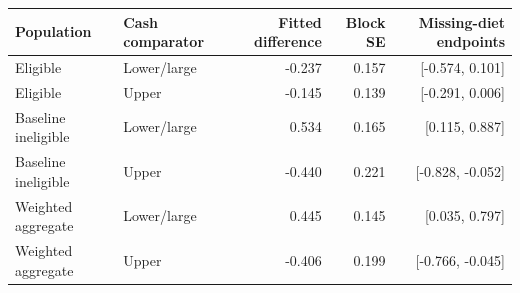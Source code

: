 \begin{tabular}{llrrr}
\toprule
Population & Cash comparator & Fitted difference & Block SE & Missing-diet endpoints\\
\midrule
Eligible & Lower/large & -0.237 & 0.157 & [-0.574, 0.101]\\
Eligible & Upper & -0.145 & 0.139 & [-0.291, 0.006]\\
Baseline ineligible & Lower/large & 0.534 & 0.165 & [0.115, 0.887]\\
Baseline ineligible & Upper & -0.440 & 0.221 & [-0.828, -0.052]\\
Weighted aggregate & Lower/large & 0.445 & 0.145 & [0.035, 0.797]\\
Weighted aggregate & Upper & -0.406 & 0.199 & [-0.766, -0.045]\\
\bottomrule
\end{tabular}
